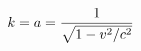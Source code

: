 \documentclass[preview]{standalone}
\begin{document}
\begin{align*}
\special{dvisvgm:raw <g id='unique000'>}k = a = \frac{1}{\sqrt{1 - v^2/c^2}}\special{dvisvgm:raw </g>}
\end{align*}
\end{document}
